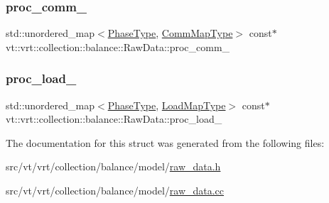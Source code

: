 \subsubsection{\texorpdfstring{proc\+\_\+comm\+\_\+}{proc\_comm\_}}
{\footnotesize\ttfamily std\+::unordered\+\_\+map$<$\hyperlink{namespacevt_a46ce6733d5cdbd735d561b7b4029f6d7}{Phase\+Type}, \hyperlink{namespacevt_1_1vrt_1_1collection_1_1balance_a01ee1fb0ae2da1d2ab7fdca3be9ae351}{Comm\+Map\+Type}$>$ const$\ast$ vt\+::vrt\+::collection\+::balance\+::\+Raw\+Data\+::proc\+\_\+comm\+\_\+}

\mbox{\label{structvt_1_1vrt_1_1collection_1_1balance_1_1_raw_data_a8ba841120376e38c83484365b57fc719}} 
\subsubsection{\texorpdfstring{proc\+\_\+load\+\_\+}{proc\_load\_}}
{\footnotesize\ttfamily std\+::unordered\+\_\+map$<$\hyperlink{namespacevt_a46ce6733d5cdbd735d561b7b4029f6d7}{Phase\+Type}, \hyperlink{namespacevt_1_1vrt_1_1collection_1_1balance_a5339303db2e1ce964d783a53fd74e6b1}{Load\+Map\+Type}$>$ const$\ast$ vt\+::vrt\+::collection\+::balance\+::\+Raw\+Data\+::proc\+\_\+load\+\_\+}



The documentation for this struct was generated from the following files\+:\begin{DoxyCompactItemize}
\item 
src/vt/vrt/collection/balance/model/\hyperlink{raw__data_8h}{raw\+\_\+data.\+h}\item 
src/vt/vrt/collection/balance/model/\hyperlink{raw__data_8cc}{raw\+\_\+data.\+cc}\end{DoxyCompactItemize}
